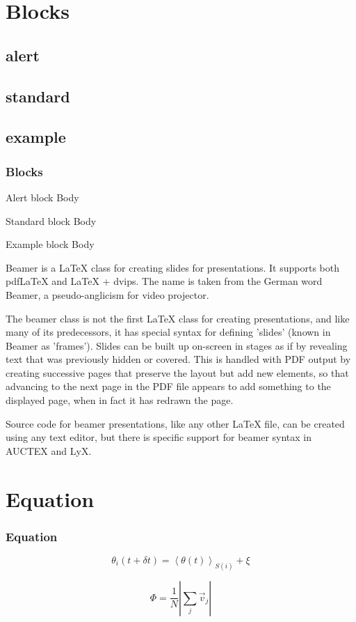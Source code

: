 \documentclass{beamer}
\begin{document}
\section{Blocks}
\subsection{alert}
\subsection{standard}
\subsection{example}

\begin{frame}
	\frametitle{Blocks}
	\begin{alertblock}{Alert block}
		Body
	\end{alertblock}

	\begin{block}{Standard block}
		Body
	\end{block}

	\begin{exampleblock}{Example block}
		Body
	\end{exampleblock}
\end{frame}

\begin{frame}
Beamer is a LaTeX class for creating slides for presentations. It supports both pdfLaTeX and LaTeX + dvips. The name is taken from the German word Beamer, a pseudo-anglicism for video projector.

The beamer class is not the first LaTeX class for creating presentations, and like many of its predecessors, it has special syntax for defining 'slides' (known in Beamer as 'frames'). Slides can be built up on-screen in stages as if by revealing text that was previously hidden or covered. This is handled with PDF output by creating successive pages that preserve the layout but add new elements, so that advancing to the next page in the PDF file appears to add something to the displayed page, when in fact it has redrawn the page.

Source code for beamer presentations, like any other LaTeX file, can be created using any text editor, but there is specific support for beamer syntax in AUCTEX and LyX.
\end{frame}

\section{Equation}
\begin{frame}
	\frametitle{Equation}
	\begin{equation}
	\theta_i(t + \delta t) = \left< \theta (t) \right> _{S(i)} + \xi
	\end{equation}
	
	\begin{equation}
	\Phi = \frac{1}{N} \left| \sum_j \vec{v}_j \right|
	\end{equation}
\end{frame}
\end{document}

